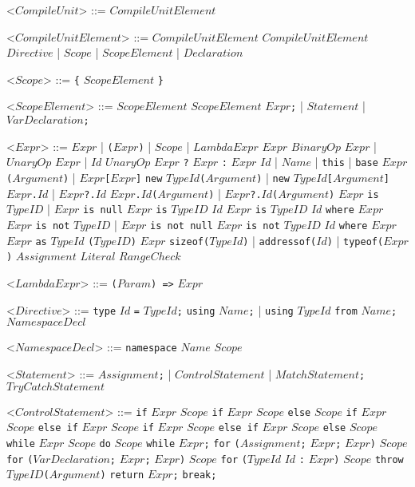 \documentclass{article}
\newcommand{\gtext}[1]{<$#1$>}
\newcommand{\glit}[1]{\texttt{#1}}
\begin{document}
\begin{grammar}

	\gtext{CompileUnit} ::= $CompileUnitElement$

	\gtext{CompileUnitElement} ::= $CompileUnitElement$ $CompileUnitElement$
	\alt $Directive$ | $Scope$ | $ScopeElement$ | $Declaration$

	\gtext{Scope} ::= \glit{\{} $ScopeElement$ \glit{\}}
	
	\gtext{ScopeElement} ::= $ScopeElement$ $ScopeElement$
	\alt $Expr$\glit{;} | $Statement$	| $VarDeclaration$\glit{;}
	
	\gtext{Expr} ::= $Expr$ | \glit{(}$Expr$\glit{)} | $Scope$ | $LambdaExpr$
	\alt $Expr$ $BinaryOp$ $Expr$ | $UnaryOp$ $Expr$ | $Id$ $UnaryOp$
	\alt $Expr$ \glit{?} $Expr$ \glit{:} $Expr$
	\alt $Id$ | $Name$ | \glit{this} | \glit{base}
	\alt $Expr$\glit{(}$Argument$\glit{)} | $Expr$\glit{[}$Expr$\glit{]}
	\alt \glit{new} $TypeId$\glit{(}$Argument$\glit{)} | \glit{new} $TypeId$\glit{[}$Argument$\glit{]}
	\alt $Expr$\glit{.}$Id$ | $Expr$\glit{?.}$Id$ 
	\alt $Expr$\glit{.}$Id$\glit{(}$Argument$\glit{)} | $Expr$\glit{?.}$Id$\glit{(}$Argument$\glit{)}
	\alt $Expr$ \glit{is} $TypeID$ | $Expr$ \glit{is null} $Expr$ \glit{is} $TypeID$ $Id$
	\alt $Expr$ \glit{is} $TypeID$ $Id$ \glit{where} $Expr$
	\alt $Expr$ \glit{is not} $TypeID$ | $Expr$ \glit{is not null}
	\alt $Expr$ \glit{is not} $TypeID$ $Id$ \glit{where} $Expr$ %
	\alt $Expr$ \glit{as} $TypeId$
	\alt \glit{(}$TypeID$\glit{)} $Expr$
	\alt \glit{sizeof($TypeId$}\glit{)} | \glit{addressof($Id$}\glit{)} | \glit{typeof($Expr$}\glit{)}
	\alt $Assignment$
	\alt $Literal$
	\alt $RangeCheck$
	
	\gtext{LambdaExpr} ::= \glit{(}$Param$\glit{) =>} $Expr$
	
	\gtext{Directive} ::= \glit{type} $Id$ \glit{=} $TypeId$\glit{;}
	\alt \glit{using} $Name$\glit{;} | \glit{using} $TypeId$ \glit{from} $Name$\glit{;}
	\alt $NamespaceDecl$

	\gtext{NamespaceDecl} ::= \glit{namespace} $Name$ $Scope$
	
	\gtext{Statement} ::= $Assignment$\glit{;} | $ControlStatement$ | $MatchStatement$\glit{;}
	\alt $TryCatchStatement$
	
	\newpage	
	
	\gtext{ControlStatement} ::= \glit{if} $Expr$ $Scope$
	\alt \glit{if} $Expr$ $Scope$ \glit{else} $Scope$
	\alt \glit{if} $Expr$ $Scope$ \glit{else if} $Expr$ $Scope$
	\alt \glit{if} $Expr$ $Scope$ \glit{else if} $Expr$ $Scope$ \glit{else} $Scope$
	\alt \glit{while} $Expr$ $Scope$
	\alt \glit{do} $Scope$ \glit{while} $Expr$\glit{;}
	\alt \glit{for} \glit{(}$Assignment$\glit{;} $Expr$\glit{;} $Expr$\glit{)} $Scope$
	\alt \glit{for} \glit{(}$VarDeclaration$\glit{;} $Expr$\glit{;} $Expr$\glit{)} $Scope$
	\alt \glit{for} \glit{(}$TypeId$ $Id$ \glit{:} $Expr$\glit{)} $Scope$
	\alt \glit{throw} $TypeID$\glit{(}$Argument$\glit{)}
	\alt \glit{return} $Expr$\glit{;}
	\alt \glit{break;}
	

\end{grammar}
\end{document}
